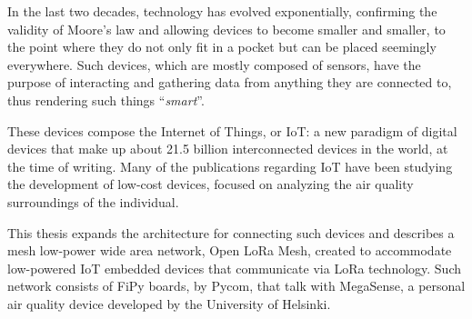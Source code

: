 
In the last two decades, technology has evolved exponentially, confirming the validity of Moore's law and allowing devices to become smaller and smaller, to the point where they do not only fit in a pocket but can be placed seemingly everywhere.
Such devices, which are mostly composed of sensors, have the purpose of interacting and gathering data from anything they are connected to, thus rendering such things ``\textit{smart}''.

These devices compose the Internet of Things, or IoT: a new paradigm of digital devices that make up about 21.5 billion interconnected devices in the world, at the time of writing.
Many of the publications regarding IoT have been studying the development of low-cost devices, focused on analyzing the air quality surroundings of the individual. 

This thesis expands the architecture for connecting such devices and describes a mesh low-power wide area network, Open LoRa Mesh, created to accommodate low-powered IoT embedded devices that communicate via LoRa technology.
Such network consists of FiPy boards, by Pycom, that talk with MegaSense, a personal air quality device developed by the University of Helsinki.